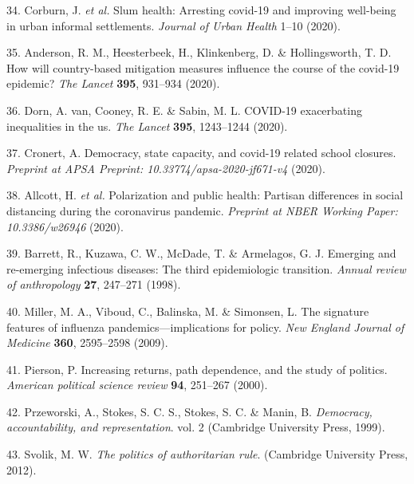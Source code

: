 \documentclass[]{article}
\begin{document}
\leavevmode\hypertarget{ref-corburn2020slum}{}%
34. Corburn, J. \emph{et al.} Slum health: Arresting covid-19 and improving well-being in urban informal settlements. \emph{Journal of Urban Health} 1--10 (2020).

\leavevmode\hypertarget{ref-anderson2020will}{}%
35. Anderson, R. M., Heesterbeek, H., Klinkenberg, D. \& Hollingsworth, T. D. How will country-based mitigation measures influence the course of the covid-19 epidemic? \emph{The Lancet} \textbf{395}, 931--934 (2020).

\leavevmode\hypertarget{ref-van2020covid}{}%
36. Dorn, A. van, Cooney, R. E. \& Sabin, M. L. COVID-19 exacerbating inequalities in the us. \emph{The Lancet} \textbf{395}, 1243--1244 (2020).

\leavevmode\hypertarget{ref-cronert2020democracy}{}%
37. Cronert, A. Democracy, state capacity, and covid-19 related school closures. \emph{Preprint at APSA Preprint: 10.33774/apsa-2020-jf671-v4} (2020).

\leavevmode\hypertarget{ref-allcott2020polarization}{}%
38. Allcott, H. \emph{et al.} Polarization and public health: Partisan differences in social distancing during the coronavirus pandemic. \emph{Preprint at NBER Working Paper: 10.3386/w26946} (2020).

\leavevmode\hypertarget{ref-barrett1998emerging}{}%
39. Barrett, R., Kuzawa, C. W., McDade, T. \& Armelagos, G. J. Emerging and re-emerging infectious diseases: The third epidemiologic transition. \emph{Annual review of anthropology} \textbf{27}, 247--271 (1998).

\leavevmode\hypertarget{ref-miller2009signature}{}%
40. Miller, M. A., Viboud, C., Balinska, M. \& Simonsen, L. The signature features of influenza pandemics---implications for policy. \emph{New England Journal of Medicine} \textbf{360}, 2595--2598 (2009).

\leavevmode\hypertarget{ref-pierson2000increasing}{}%
41. Pierson, P. Increasing returns, path dependence, and the study of politics. \emph{American political science review} \textbf{94}, 251--267 (2000).

\leavevmode\hypertarget{ref-przeworski1999democracy}{}%
42. Przeworski, A., Stokes, S. C. S., Stokes, S. C. \& Manin, B. \emph{Democracy, accountability, and representation}. vol. 2 (Cambridge University Press, 1999).

\leavevmode\hypertarget{ref-svolik2012politics}{}%
43. Svolik, M. W. \emph{The politics of authoritarian rule}. (Cambridge University Press, 2012).
\end{document}
